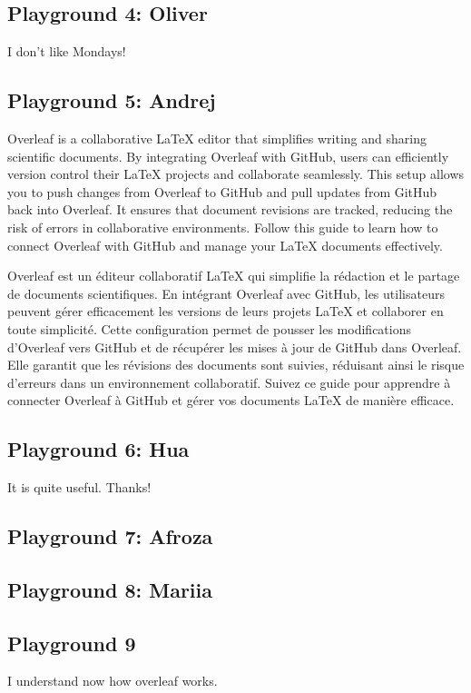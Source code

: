 \documentclass{article}
\begin{document}
\subsection{Playground 4: Oliver}
I don't like Mondays!

\subsection{Playground 5: Andrej}
Overleaf is a collaborative LaTeX editor that simplifies writing and sharing scientific documents. By integrating Overleaf with GitHub, users can efficiently version control their LaTeX projects and collaborate seamlessly. This setup allows you to push changes from Overleaf to GitHub and pull updates from GitHub back into Overleaf. It ensures that document revisions are tracked, reducing the risk of errors in collaborative environments. Follow this guide to learn how to connect Overleaf with GitHub and manage your LaTeX documents effectively.

Overleaf est un éditeur collaboratif LaTeX qui simplifie la rédaction et le partage de documents scientifiques. En intégrant Overleaf avec GitHub, les utilisateurs peuvent gérer efficacement les versions de leurs projets LaTeX et collaborer en toute simplicité. Cette configuration permet de pousser les modifications d’Overleaf vers GitHub et de récupérer les mises à jour de GitHub dans Overleaf. Elle garantit que les révisions des documents sont suivies, réduisant ainsi le risque d’erreurs dans un environnement collaboratif. Suivez ce guide pour apprendre à connecter Overleaf à GitHub et gérer vos documents LaTeX de manière efficace.

\subsection{Playground 6: Hua}
It is quite useful. Thanks!

\subsection{Playground 7: Afroza}

\subsection{Playground 8: Mariia}

\subsection{Playground 9}
I understand now how overleaf works.
\end{document}
